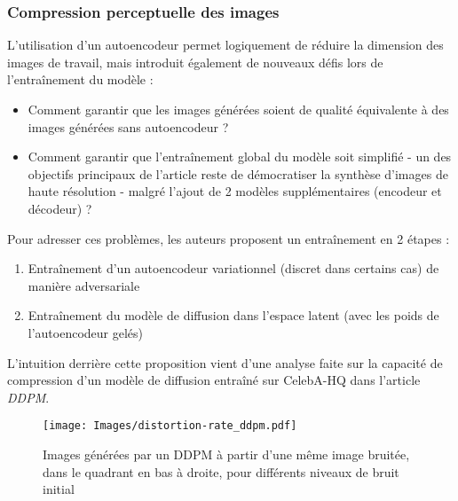 \documentclass{article}
\begin{document}
\subsubsection{Compression perceptuelle des images}
L'utilisation d'un autoencodeur permet logiquement de réduire la dimension des images de travail, mais introduit également de nouveaux défis lors de l'entraînement du modèle :
\begin{itemize}
    \item Comment garantir que les images générées soient de qualité équivalente à des images générées sans autoencodeur ?
    \item Comment garantir que l'entraînement global du modèle soit simplifié - un des objectifs principaux de l'article reste de démocratiser la synthèse d'images de haute résolution - malgré l'ajout de 2 modèles supplémentaires (encodeur et décodeur) ?
\end{itemize}
Pour adresser ces problèmes, les auteurs proposent un entraînement en 2 étapes :
\begin{enumerate}
    \item Entraînement d'un autoencodeur variationnel (discret dans certains cas) de manière adversariale
    \item Entraînement du modèle de diffusion dans l'espace latent (avec les poids de l'autoencodeur gelés)
\end{enumerate}
L'intuition derrière cette proposition vient d'une analyse faite sur la capacité de compression d'un modèle de diffusion entraîné sur CelebA-HQ dans l'article \textit{DDPM}.

\begin{figure}[H]
    \centering
    \texttt{[image: Images/distortion-rate\_ddpm.pdf]}
    \caption{Images générées par un DDPM à partir d'une même image bruitée, dans le quadrant en bas à droite, pour différents niveaux de bruit initial}
    \label{distortion-rate}
\end{figure}
\end{document}
